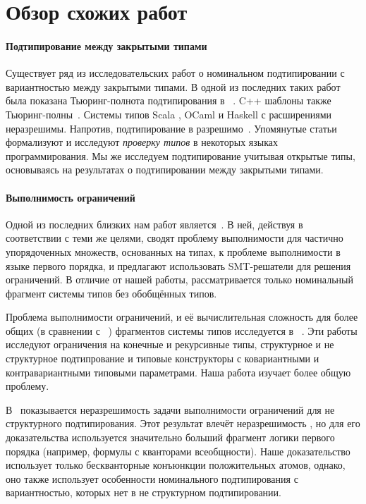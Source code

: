 \section{Обзор схожих работ}

\paragraph{Подтипирование между закрытыми типами}
Существует ряд из исследовательских работ о номинальном подтипировании с вариантностью между закрытыми типами. В одной из последних таких работ была показана Тьюринг-полнота подтипирования в \java{}~\cite{grigore2017java}. C++ шаблоны также Тьюринг-полны~\cite{veldhuizen2003c++}. Системы типов Scala \cite{odersky2016scaling}, OCaml \cite{lillibridge1997translucent, rossberg1999undecidability} и Haskell с расширениями~\cite{sulzmann2007understanding} неразрешимы. Напротив, подтипирование в \dotnet{} разрешимо~\cite{emir2006variance,kennedy2006decidability}. Упомянутые статьи формализуют и исследуют \emph{проверку типов} в некоторых языках программирования. Мы же исследуем подтипирование учитывая открытые типы, основываясь на результатах о подтипировании между закрытыми типами.

\paragraph{Выполнимость ограничений}
Одной из последних близких нам работ является~\cite{sherman2015deciding}. В ней, действуя в соответствии с  теми же целями, сводят проблему выполнимости для частично упорядоченных множеств, основанных на типах, к проблеме выполнимости в языке первого порядка, и предлагают использовать SMT-решатели для решения ограничений. В отличие от нашей работы, рассматривается только номинальный фрагмент системы типов \java{} без обобщённых типов.

Проблема выполнимости ограничений, и её вычислительная сложность для более общих (в сравнении с ~\cite{sherman2015deciding}) фрагментов системы типов исследуется в ~\cite{pratt1996satisfiability, frey1997satisfying, kuncak2003structural, niehren2005complexity}. Эти работы исследуют ограничения на конечные и рекурсивные типы, структурное и не структурное подтипрование и типовые конструкторы с ковариантными и контравариантными типовыми параметрами. Наша работа изучает более общую проблему.

В~\cite{su2002first} показывается неразрешимость задачи выполнимости ограничений для не структурного подтипирования. Этот результат влечёт неразрешимость \subtypesat{}, но для его доказательства используется значительно больший фрагмент логики первого порядка (например, формулы с кванторами всеобщности). Наше доказательство использует только бескванторные конъюнкции положительных атомов, однако, оно также использует особенности номинального подтипирования с вариантностью, которых нет в не структурном подтипировании.

